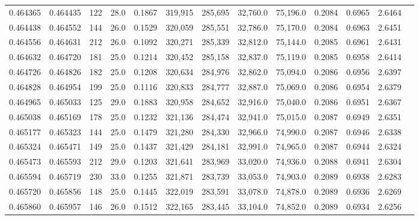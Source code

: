 \begin{tabular}{rrrrrrrrrrrrr}
0.464365 & 0.464435 &   122 & 28.0 &                                     0.1867 & 319,915 & 285,695 &  32,760.0 &  75,196.0 & 0.2084 & 0.6965 & 2.6464 \\
0.464438 & 0.464552 &   144 & 26.0 &                                     0.1529 & 320,059 & 285,551 &  32,786.0 &  75,170.0 & 0.2084 & 0.6963 & 2.6451 \\
0.464556 & 0.464631 &   212 & 26.0 &                                     0.1092 & 320,271 & 285,339 &  32,812.0 &  75,144.0 & 0.2085 & 0.6961 & 2.6431 \\
0.464632 & 0.464720 &   181 & 25.0 &                                     0.1214 & 320,452 & 285,158 &  32,837.0 &  75,119.0 & 0.2085 & 0.6958 & 2.6414 \\
0.464726 & 0.464826 &   182 & 25.0 &                                     0.1208 & 320,634 & 284,976 &  32,862.0 &  75,094.0 & 0.2086 & 0.6956 & 2.6397 \\
0.464828 & 0.464954 &   199 & 25.0 &                                     0.1116 & 320,833 & 284,777 &  32,887.0 &  75,069.0 & 0.2086 & 0.6954 & 2.6379 \\
0.464965 & 0.465033 &   125 & 29.0 &                                     0.1883 & 320,958 & 284,652 &  32,916.0 &  75,040.0 & 0.2086 & 0.6951 & 2.6367 \\
0.465038 & 0.465169 &   178 & 25.0 &                                     0.1232 & 321,136 & 284,474 &  32,941.0 &  75,015.0 & 0.2087 & 0.6949 & 2.6351 \\
0.465177 & 0.465323 &   144 & 25.0 &                                     0.1479 & 321,280 & 284,330 &  32,966.0 &  74,990.0 & 0.2087 & 0.6946 & 2.6338 \\
0.465324 & 0.465471 &   149 & 25.0 &                                     0.1437 & 321,429 & 284,181 &  32,991.0 &  74,965.0 & 0.2087 & 0.6944 & 2.6324 \\
0.465473 & 0.465593 &   212 & 29.0 &                                     0.1203 & 321,641 & 283,969 &  33,020.0 &  74,936.0 & 0.2088 & 0.6941 & 2.6304 \\
0.465594 & 0.465719 &   230 & 33.0 &                                     0.1255 & 321,871 & 283,739 &  33,053.0 &  74,903.0 & 0.2089 & 0.6938 & 2.6283 \\
0.465720 & 0.465856 &   148 & 25.0 &                                     0.1445 & 322,019 & 283,591 &  33,078.0 &  74,878.0 & 0.2089 & 0.6936 & 2.6269 \\
0.465860 & 0.465957 &   146 & 26.0 &                                     0.1512 & 322,165 & 283,445 &  33,104.0 &  74,852.0 & 0.2089 & 0.6934 & 2.6256 \\

\end{tabular}
